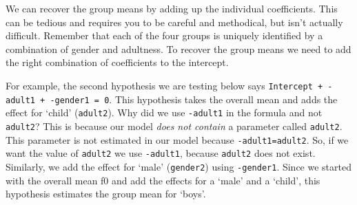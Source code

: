 \documentclass[
]{book}
\newenvironment{Shaded}{\begin{snugshade}}{\end{snugshade}}
\newcommand{\CommentTok}[1]{\textcolor[rgb]{0.56,0.35,0.01}{\textit{#1}}}
\newcommand{\DecValTok}[1]{\textcolor[rgb]{0.00,0.00,0.81}{#1}}
\newcommand{\DocumentationTok}[1]{\textcolor[rgb]{0.56,0.35,0.01}{\textbf{\textit{#1}}}}
\newcommand{\FunctionTok}[1]{\textcolor[rgb]{0.00,0.00,0.00}{#1}}
\newcommand{\NormalTok}[1]{#1}
\newcommand{\OtherTok}[1]{\textcolor[rgb]{0.56,0.35,0.01}{#1}}
\newcommand{\SpecialCharTok}[1]{\textcolor[rgb]{0.00,0.00,0.00}{#1}}
\newcommand{\StringTok}[1]{\textcolor[rgb]{0.31,0.60,0.02}{#1}}
\begin{document}
\begin{Shaded}
\end{Shaded}

We can recover the group means by adding up the individual coefficients. This can be tedious and requires you to be careful and methodical, but isn't actually difficult. Remember that each of the four groups is uniquely identified by a combination of gender and adultness. To recover the group means we need to add the right combination of coefficients to the intercept.

For example, the second hypothesis we are testing below says \texttt{Intercept\ +\ -adult1\ +\ -gender1\ =\ 0}. This hypothesis takes the overall mean and adds the effect for `child' (\texttt{adult2}). Why did we use \texttt{-adult1} in the formula and not \texttt{adult2}? This is because our model \emph{does not contain} a parameter called \texttt{adult2}. This parameter is not estimated in our model because \texttt{-adult1=adult2}. So, if we want the value of \texttt{adult2} we use \texttt{-adult1}, because \texttt{adult2} does not exist. Similarly, we add the effect for `male' (\texttt{gender2}) using \texttt{-gender1}. Since we started with the overall mean f0 and add the effects for a `male' and a `child', this hypothesis estimates the group mean for `boys'.
\end{document}
